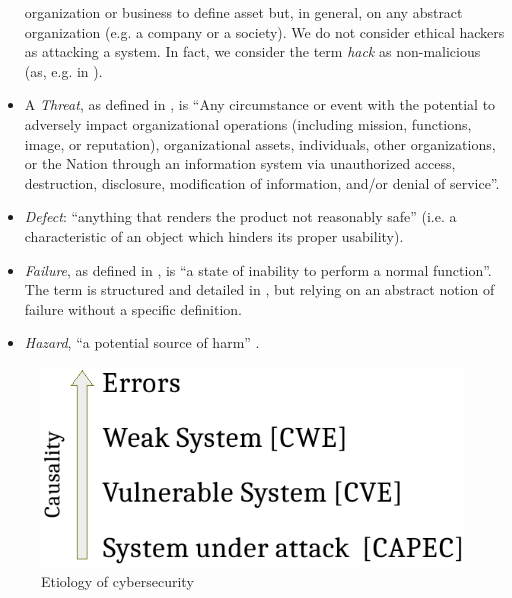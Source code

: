 \documentclass[conference]{IEEEtran}
\begin{document}
\begin{itemize}
		organization or business to define asset but, in general, on any 
		abstract organization (e.g. a company or a society).
		We do not consider ethical hackers as attacking a system. 
		In fact, we consider the term \emph{hack} as
		non-malicious (as, e.g. in \autocite{Stallman2002hacker}).
	\item A \emph{Threat}, as defined in \autocite{cnssi20104009}, is ``Any
		circumstance or event with the potential to adversely impact
		organizational operations (including mission, functions, image,
		or reputation), organizational assets, individuals, other
		organizations, or the Nation through an information system via
		unauthorized access, destruction, disclosure, modification of
		information, and/or denial of service''.
	\item \emph{Defect}: ``anything that renders the product not reasonably
		safe'' \autocite{Robinson2019writing} (i.e. a characteristic of
		an object which hinders its proper usability).
	\item \emph{Failure}, as defined in \autocite{Merriam2020failure}, is ``a state of
		inability to perform a normal function''. The term is
		structured and detailed in
		\autocite{cnssi20104009,iet2017glossary}, but relying on an
		abstract notion of failure without a specific definition.
	\item \emph{Hazard}, ``a potential source of
		harm'' \autocite{iet2017glossary}.
\end{itemize}

\begin{figure}[t]
	\centering
	\includegraphics[width=.6\columnwidth]{causality.pdf}
	\caption{Etiology of cybersecurity}
	\label{fig:causality}
\end{figure}
\end{document}
